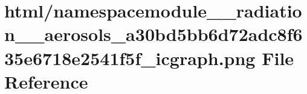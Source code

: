 \hypertarget{namespacemodule____radiation____aerosols__a30bd5bb6d72adc8f635e6718e2541f5f__icgraph_8png}{}\section{html/namespacemodule\+\_\+\+\_\+radiation\+\_\+\+\_\+aerosols\+\_\+a30bd5bb6d72adc8f635e6718e2541f5f\+\_\+icgraph.png File Reference}
\label{namespacemodule____radiation____aerosols__a30bd5bb6d72adc8f635e6718e2541f5f__icgraph_8png}
